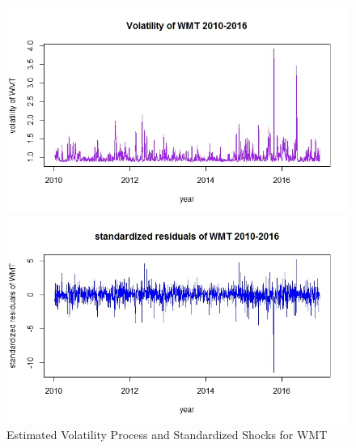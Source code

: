 \documentclass[paper=a4, fontsize=11pt]{article}
\begin{document}
\begin{figure}[!htbp]
\begin{minipage}[!htbp]{0.5\linewidth}
\centering
\includegraphics[scale = 0.45]{img/vol_WMT}
\end{minipage}
\begin{minipage}[!htbp]{0.5\linewidth}
\centering
\includegraphics[scale = 0.45]{img/stdr_WMT}
\end{minipage}
\caption{Estimated Volatility Process and Standardized Shocks for WMT}
\label{vol_stdr_wmt}
\end{figure}
\end{document}
